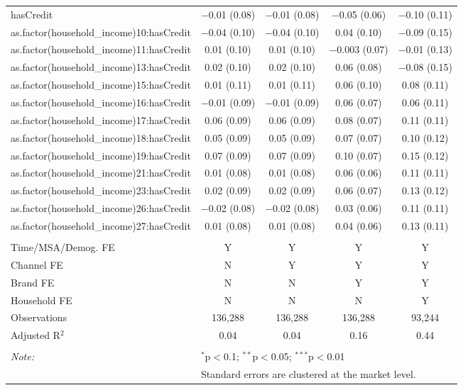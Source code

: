 \begin{table}[!htbp]
\begin{tabular}{@{\extracolsep{5pt}}lcccc}
  hasCredit & $-$0.01 (0.08) & $-$0.01 (0.08) & $-$0.05 (0.06) & $-$0.10 (0.11) \\ 
  as.factor(household\_income)10:hasCredit & $-$0.04 (0.10) & $-$0.04 (0.10) & 0.04 (0.10) & $-$0.09 (0.15) \\ 
  as.factor(household\_income)11:hasCredit & 0.01 (0.10) & 0.01 (0.10) & $-$0.003 (0.07) & $-$0.01 (0.13) \\ 
  as.factor(household\_income)13:hasCredit & 0.02 (0.10) & 0.02 (0.10) & 0.06 (0.08) & $-$0.08 (0.15) \\ 
  as.factor(household\_income)15:hasCredit & 0.01 (0.11) & 0.01 (0.11) & 0.06 (0.10) & 0.08 (0.11) \\ 
  as.factor(household\_income)16:hasCredit & $-$0.01 (0.09) & $-$0.01 (0.09) & 0.06 (0.07) & 0.06 (0.11) \\ 
  as.factor(household\_income)17:hasCredit & 0.06 (0.09) & 0.06 (0.09) & 0.08 (0.07) & 0.11 (0.11) \\ 
  as.factor(household\_income)18:hasCredit & 0.05 (0.09) & 0.05 (0.09) & 0.07 (0.07) & 0.10 (0.12) \\ 
  as.factor(household\_income)19:hasCredit & 0.07 (0.09) & 0.07 (0.09) & 0.10 (0.07) & 0.15 (0.12) \\ 
  as.factor(household\_income)21:hasCredit & 0.01 (0.08) & 0.01 (0.08) & 0.06 (0.06) & 0.11 (0.11) \\ 
  as.factor(household\_income)23:hasCredit & 0.02 (0.09) & 0.02 (0.09) & 0.06 (0.07) & 0.13 (0.12) \\ 
  as.factor(household\_income)26:hasCredit & $-$0.02 (0.08) & $-$0.02 (0.08) & 0.03 (0.06) & 0.11 (0.11) \\ 
  as.factor(household\_income)27:hasCredit & 0.01 (0.08) & 0.01 (0.08) & 0.04 (0.06) & 0.13 (0.11) \\ 
 \hline \\[-1.8ex] 
Time/MSA/Demog. FE & Y & Y & Y & Y \\ 
Channel FE & N & Y & Y & Y \\ 
Brand FE & N & N & Y & Y \\ 
Household FE & N & N & N & Y \\ 
Observations & 136,288 & 136,288 & 136,288 & 93,244 \\ 
Adjusted R$^{2}$ & 0.04 & 0.04 & 0.16 & 0.44 \\ 
\hline 
\hline \\[-1.8ex] 
\textit{Note:}  & \multicolumn{4}{l}{$^{*}$p$<$0.1; $^{**}$p$<$0.05; $^{***}$p$<$0.01} \\ 
 & \multicolumn{4}{l}{Standard errors are clustered at the market level.} \\ 
\end{tabular} 
\end{table} 
